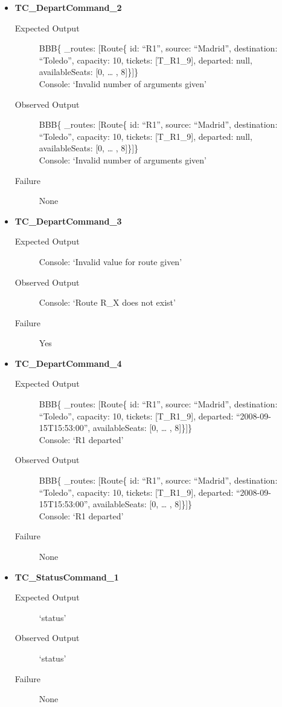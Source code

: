 \documentclass[11pt]{article}
\begin{document}
\begin{itemize}
\item \textbf{TC\_DepartCommand\_2}
\begin{description}
\item[{Expected Output}] BBB\{ \_routes: [Route\{ id: “R1”, source: “Madrid”, destination: “Toledo”, capacity: 10,  tickets: [T\_R1\_9], departed: null, availableSeats: [0, … , 8]\}]\}\\
Console: ‘Invalid number of arguments given’
\item[{Observed Output}] BBB\{ \_routes: [Route\{ id: “R1”, source: “Madrid”, destination: “Toledo”, capacity: 10,  tickets: [T\_R1\_9], departed: null, availableSeats: [0, … , 8]\}]\}\\
Console: ‘Invalid number of arguments given’
\item[{Failure}] None
\end{description}

\item \textbf{TC\_DepartCommand\_3}
\begin{description}
\item[{Expected Output}] Console: ‘Invalid value for route given'
\item[{Observed Output}] Console: ‘Route R\_X does not exist’
\item[{Failure}] Yes
\end{description}

\item \textbf{TC\_DepartCommand\_4}
\begin{description}
\item[{Expected Output}] BBB\{ \_routes: [Route\{ id: “R1”, source: “Madrid”, destination: “Toledo”, capacity: 10,  tickets: [T\_R1\_9], departed: “2008-09-15T15:53:00”, availableSeats: [0, … , 8]\}]\}\\
Console: ‘R1 departed’
\item[{Observed Output}] BBB\{ \_routes: [Route\{ id: “R1”, source: “Madrid”, destination: “Toledo”, capacity: 10,  tickets: [T\_R1\_9], departed: “2008-09-15T15:53:00”, availableSeats: [0, … , 8]\}]\}\\
Console: ‘R1 departed’
\item[{Failure}] None
\end{description}

\item \textbf{TC\_StatusCommand\_1}
\begin{description}
\item[{Expected Output}] ‘status’
\item[{Observed Output}] ‘status’
\item[{Failure}] None
\end{description}


\end{itemize}
\end{document}
